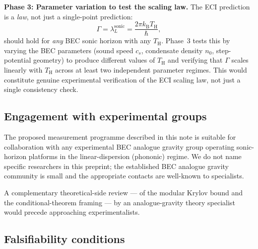 \documentclass[12pt,a4paper]{article}
\renewcommand{\TH}{T_{\mathrm{H}}}
\newcommand{\lambdaL}{\lambda_L^{\mathrm{sonic}}}
\newcommand{\kB}{k_{\mathrm{B}}}
\begin{document}
\medskip
\noindent\textbf{Phase 3: Parameter variation to test the scaling law.}
The ECI prediction is a \emph{law}, not just a single-point prediction:
\begin{equation}
  \Gamma = \lambdaL = \frac{2\pi\kB\TH}{\hbar},
\end{equation}
should hold for \emph{any} BEC sonic horizon with any $\TH$.
Phase~3 tests this by varying the BEC parameters (sound speed $c_s$,
condensate density $n_0$, step-potential geometry) to produce different
values of $\TH$ and verifying that $\Gamma$ scales linearly with $\TH$
across at least two independent parameter regimes.
This would constitute genuine experimental verification of the ECI scaling
law, not just a single consistency check.

\subsection{Engagement with experimental groups}

The proposed measurement programme described in this note is suitable
for collaboration with any experimental BEC analogue gravity group
operating sonic-horizon platforms in the linear-dispersion (phononic)
regime. We do not name specific researchers in this preprint; the
established BEC analogue gravity community is small and the appropriate
contacts are well-known to specialists.

A complementary theoretical-side review --- of the modular Krylov bound
and the conditional-theorem framing --- by an analogue-gravity theory
specialist would precede approaching experimentalists.

\subsection{Falsifiability conditions}
\end{document}
